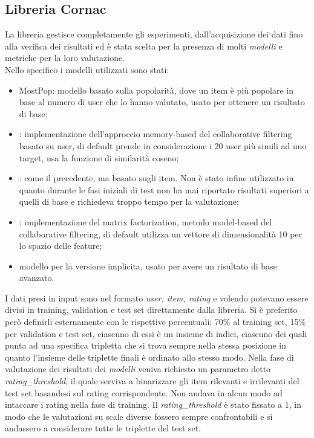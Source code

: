 \subsection{Libreria Cornac}
La libreria  gestisce completamente gli esperimenti, dall'acquisizione dei dati fino alla verifica dei risultati ed è stata scelta per la presenza di molti \textit{modelli} e metriche per la loro valutazione.\\
Nello specifico i modelli utilizzati sono stati:
\begin{itemize}
    \item MostPop: modello basato sulla popolarità, dove un item è più popolare in base al numero di user che lo hanno valutato, usato per ottenere un risultato di base;
    \item {}: implementazione dell'approccio memory-based del collaborative filtering basato su user, di default prende in considerazione i 20 user più simili ad uno target, usa la funzione di similarità coseno;
    \item {}: come il precedente, ma basato sugli item. Non è stato infine utilizzato in quanto durante le fasi iniziali di test non ha mai riportato risultati superiori a quelli di base e richiedeva troppo tempo per la valutazione;
    \item {}: implementazione del matrix factorization, metodo model-based del collaborative filtering, di default utilizza un vettore di dimensionalità 10 per lo spazio delle feature;
    \item {} modello per la versione implicita, usato per avere un risultato di base avanzato.
\end{itemize}
I dati presi in input sono nel formato \textit{user, item, rating} e volendo potevano essere divisi in training, validation e test set direttamente dalla libreria.
Si è preferito però definirli esternamente con le rispettive percentuali: 70\% al training set, 15\% per validation e test set, ciascuno di essi è un insieme di indici, ciascuno dei quali punta ad una specifica tripletta che si trova sempre nella stessa posizione in quanto l'insieme delle triplette finali è ordinato allo stesso modo.
Nella fase di valutazione dei risultati dei \textit{modelli} veniva richiesto un parametro detto \textit{rating\_threshold}, il quale serviva a binarizzare gli item rilevanti e irrilevanti del test set basandosi sul rating corrispondente. Non andava in alcun modo ad intaccare i rating nella fase di training. Il \textit{rating\_threshold} è stato fissato a 1, in modo che le valutazioni su scale diverse fossero sempre confrontabili e si andassero a considerare tutte le triplette del test set.
 
